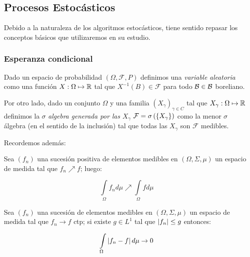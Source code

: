 \subsection{Procesos Estoc\'asticos}

Debido a la naturaleza de los algoritmos estoc\'asticos, tiene sentido repasar los conceptos b\'asicos que utilizaremos en su estudio.

\subsubsection{Esperanza condicional}

Dado un espacio de probabilidad $\left(\Omega, \mathcal{F}, P\right)$ definimos una \textit{variable aleatoria } como una funci\'on $X : \Omega \mapsto {\mathbb{R}}$ tal que $X^{-1}(B) \in \mathcal{F}$ para todo $\mathcal{B} \in \mathcal{B}$ boreliano.

Por otro lado, dado un conjunto $\Omega$ y una familia $\left(X_{\gamma}\right)_{\gamma \in C}$ tal que $X_{\gamma}: \Omega \mapsto {\mathbb{R}}$ definimos la \textit{$\sigma$ algebra generada por las $X_\gamma$} $\mathcal{F} = \sigma\left(\left\lbrace X_{\gamma}\right\rbrace\right)$ como la menor $\sigma$ \'algebra (en el sentido de la inclusi\'on) tal que todas las $X_{\gamma}$ son $\mathcal{F}$ medibles.

Recordemos adem\'as:

\begin{theorem}
	\label{theorem: Convergencia monotona}
	Sea $(f_n)$ una sucesi\'on positiva de elementos medibles en $(\Omega, \Sigma, \mu)$ un espacio de medida tal que $f_n \nearrow f$; luego:
	
	\begin{equation*}
		\int\limits_{\Omega} {f_n d\mu} \nearrow \int\limits_{\Omega}{f d\mu} 
	\end{equation*} 
\end{theorem}

\begin{theorem}
	\label{theorem: Convergencia dominada}
	Sea $(f_n)$ una sucesi\'on de elementos medibles en $(\Omega, \Sigma, \mu)$ un espacio de medida tal que $f_n \rightarrow f$ ctp; si existe $g \in L^1$ tal que $\left\lvert f_n\right\rvert \leq g$ entonces:
	
	\begin{equation*}
	\int\limits_{\Omega} {\left\lvert f_n -f\right\rvert d\mu} \rightarrow 0
	\end{equation*} 
\end{theorem}

